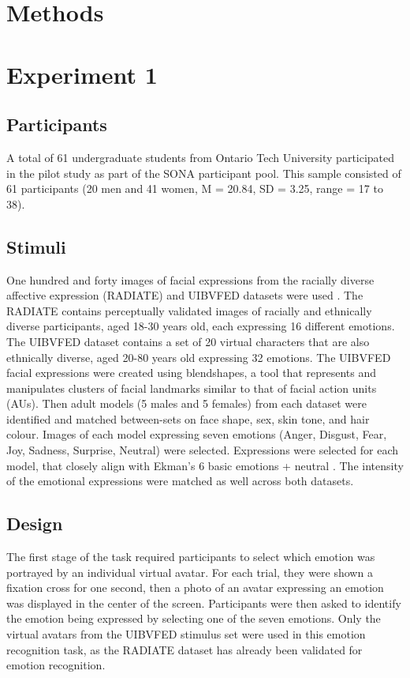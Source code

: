 \section*{Methods}
\label{sec:methods}
\section*{Experiment 1}
\subsection*{Participants}
A total of 61 undergraduate students from Ontario Tech University participated in the pilot study as part of the SONA participant pool.
This sample consisted of 61 participants (20 men and 41 women, M = 20.84, SD = 3.25, range = 17 to 38).

\subsection*{Stimuli}
\label{sec:Stimuli}
One hundred and forty images of facial expressions from the racially diverse affective expression (RADIATE) and UIBVFED datasets were used \citep{conley_racially_2018, oliver_uibvfed_2020}.
The RADIATE contains perceptually validated images of racially and ethnically diverse participants, aged 18-30 years old, each expressing 16 different emotions. 
The UIBVFED dataset contains a set of 20 virtual characters that are also ethnically diverse, aged 20-80 years old expressing 32 emotions. 
The UIBVFED facial expressions were created using blendshapes, a tool that represents and manipulates clusters of facial landmarks similar to that of facial action units (AUs).
Then adult models (5 males and 5 females) from each dataset were identified and matched between-sets on face shape, sex, skin tone, and hair colour. 
Images of each model expressing seven emotions (Anger, Disgust, Fear, Joy, Sadness, Surprise, Neutral) were selected. 
Expressions were selected for each model, that closely align with Ekman's 6 basic emotions + neutral \citep{ekman1971constants}.
The intensity of the emotional expressions were matched as well across both datasets. 

\subsection*{Design}
The first stage of the task required participants to select which emotion was portrayed by an individual virtual avatar.
For each trial, they were shown a fixation cross for one second, then a photo of an avatar expressing an emotion was displayed in the center of the screen.
Participants were then asked to identify the emotion being expressed by selecting one of the seven emotions. 
Only the virtual avatars from the UIBVFED stimulus set were used in this emotion recognition task, as the RADIATE dataset has already been validated for emotion recognition. 


